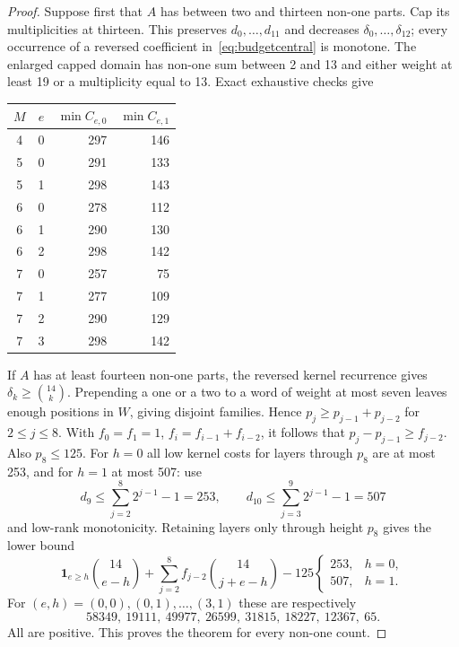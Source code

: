 \begin{proof}
Suppose first that $A$ has between two and thirteen non-one parts. Cap its multiplicities at thirteen. This preserves $d_0,\ldots,d_{11}$ and decreases $\delta_0,\ldots,\delta_{12}$; every occurrence of a reversed coefficient in~\eqref{eq:budgetcentral} is monotone. The enlarged capped domain has non-one sum between 2 and 13 and either weight at least 19 or a multiplicity equal to 13. Exact exhaustive checks give
\begin{center}
\begin{tabular}{ccrr}\toprule
$M$ & $e$ & $\min C_{e,0}$ & $\min C_{e,1}$\\\midrule
4&0&297&146\\
5&0&291&133\\5&1&298&143\\
6&0&278&112\\6&1&290&130\\6&2&298&142\\
7&0&257&75\\7&1&277&109\\7&2&290&129\\7&3&298&142\\\bottomrule
\end{tabular}
\end{center}

If $A$ has at least fourteen non-one parts, the reversed kernel recurrence gives $\delta_k\ge\binom{14}{k}$. Prepending a one or a two to a word of weight at most seven leaves enough positions in $W$, giving disjoint families. Hence $p_j\ge p_{j-1}+p_{j-2}$ for $2\le j\le8$. With $f_0=f_1=1$, $f_i=f_{i-1}+f_{i-2}$, it follows that $p_j-p_{j-1}\ge f_{j-2}$. Also $p_8\le125$. For $h=0$ all low kernel costs for layers through $p_8$ are at most 253, and for $h=1$ at most 507: use
\[
 d_9\le\sum_{j=2}^{8}2^{j-1}-1=253,\qquad
 d_{10}\le\sum_{j=3}^{9}2^{j-1}-1=507
\]
and low-rank monotonicity. Retaining layers only through height $p_8$ gives the lower bound
\[
 \mathbf1_{e\ge h}\binom{14}{e-h}
 +\sum_{j=2}^{8}f_{j-2}\binom{14}{j+e-h}
 -125\begin{cases}253,&h=0,\\507,&h=1.\end{cases}
\]
For $(e,h)=(0,0),(0,1),\ldots,(3,1)$ these are respectively
\[
 58349,\ 19111,\ 49977,\ 26599,\ 31815,\ 18227,\ 12367,\ 65.
\]
All are positive. This proves the theorem for every non-one count.
\end{proof}
